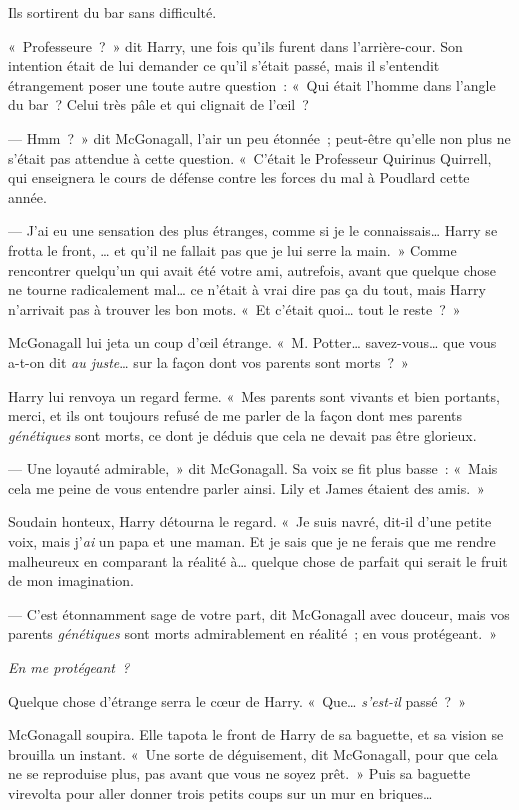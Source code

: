 Ils sortirent du bar sans difficulté.

«~Professeure~?~» dit Harry, une fois qu'ils furent dans l'arrière-cour. Son intention était de lui demander ce qu'il s'était passé, mais il s'entendit étrangement poser une toute autre question~: «~Qui était l'homme dans l'angle du bar~? Celui très pâle et qui clignait de l'œil~?

--- Hmm~?~» dit McGonagall, l'air un peu étonnée~; peut-être qu'elle non plus ne s'était pas attendue à cette question. «~C'était le Professeur Quirinus Quirrell, qui enseignera le cours de défense contre les forces du mal à Poudlard cette année.

--- J'ai eu une sensation des plus étranges, comme si je le connaissais… Harry se frotta le front, … et qu'il ne fallait pas que je lui serre la main.~» Comme rencontrer quelqu'un qui avait été votre ami, autrefois, avant que quelque chose ne tourne radicalement mal… ce n'était à vrai dire pas ça du tout, mais Harry n'arrivait pas à trouver les bon mots. «~Et c'était quoi… tout le reste~?~»

McGonagall lui jeta un coup d'œil étrange. «~M.  Potter… savez-vous… que vous a-t-on dit \emph{au juste}… sur la façon dont vos parents sont morts~?~»

Harry lui renvoya un regard ferme. «~Mes parents sont vivants et bien portants, merci, et ils ont toujours refusé de me parler de la façon dont mes parents \emph{génétiques} sont morts, ce dont je déduis que cela ne devait pas être glorieux.

--- Une loyauté admirable,~» dit McGonagall. Sa voix se fit plus basse~: «~Mais cela me peine de vous entendre parler ainsi. Lily et James étaient des amis.~»

Soudain honteux, Harry détourna le regard. «~Je suis navré, dit-il d'une petite voix, mais j'\emph{ai} un papa et une maman. Et je sais que je ne ferais que me rendre malheureux en comparant la réalité à… quelque chose de parfait qui serait le fruit de mon imagination.

--- C'est étonnamment sage de votre part, dit McGonagall avec douceur, mais vos parents \emph{génétiques} sont morts admirablement en réalité~; en vous protégeant.~»

\emph{En me protégeant~?}

Quelque chose d'étrange serra le cœur de Harry.  «~Que… \emph{s'est-il} passé~?~»

McGonagall soupira. Elle tapota le front de Harry de sa baguette, et sa vision se brouilla un instant. «~Une sorte de déguisement, dit McGonagall, pour que cela ne se reproduise plus, pas avant que vous ne soyez prêt.~» Puis sa baguette virevolta pour aller donner trois petits coups sur un mur en briques…

